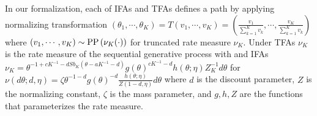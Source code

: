 \documentclass[letterpaper]{article}
\begin{document}
In our formalization, each of IFAs and TFAs defines a path by applying normalizing transformation $(\theta_1,\cdots,\theta_K)=T(v_1,\cdots,v_K)=\left(\frac{v_1}{\sum_{k=1}^Kv_k},\cdots,\frac{v_K}{\sum_{k=1}^Kv_k}\right)$ where $(v_1,\cdots,v_K)\sim\mathrm{PP}\left(\nu_K(\cdot)\right)$ for truncated rate measure $\nu_K$. Under TFAs $\nu_K$ is the rate measure of the sequential generative process with and IFAs $\nu_K=\theta^{-1+cK^{-1}-dSb_K(\theta-a K^{-1}-d)}g(\theta)^{cK^{-1}-d}h(\theta;\eta)Z_K^{-1}d\theta$ for $\nu(d\theta;d,\eta)=\zeta\theta^{-1-d}g(\theta)^{-d}\frac{h(\theta;\eta)}{Z(1-d,\eta)}d\theta$ where $d$ is the discount parameter, $Z$ is the normalizing  constant, $\zeta$ is the mass parameter, and $g,h,Z$ are the functions that parameterizes the rate measure.

{
\small


}

\appendix
\end{document}
